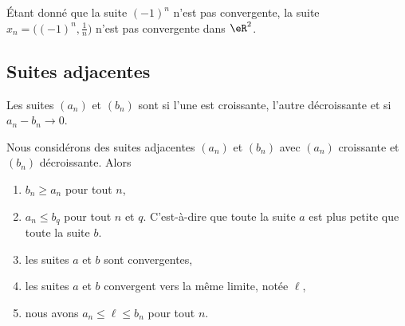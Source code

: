 \begin{example}
	Étant donné que la suite $(-1)^n$ n'est pas convergente, la suite $x_n=\big( (-1)^n,\frac{1}{ n } \big)$ n'est pas convergente dans $\eR^2$.
\end{example}

\subsection{Suites adjacentes}

\begin{definition}       \label{DEFooDMZLooDtNPmu}
    Les suites \( (a_n)\) et \( (b_n)\) sont  si l'une est croissante, l'autre décroissante et si \( a_n-b_n\to 0\).
\end{definition}

\begin{theorem}      \label{THOooZJWLooAtGMxD}
    Nous considérons des suites adjacentes \( (a_n)\) et \( (b_n)\) avec \( (a_n)\) croissante et \( (b_n)\) décroissante. Alors
    \begin{enumerate}
        \item
            \( b_n\geq a_n\) pour tout \( n\),
        \item
            \( a_n\leq b_q\) pour tout \( n\) et \( q\). C'est-à-dire que toute la suite \( a\) est plus petite que toute la suite \( b\).
        \item
            les suites \( a\) et \( b\) sont convergentes,
        \item
            les suites \( a\) et \( b\) convergent vers la même limite, notée \( \ell\),
        \item
            nous avons \( a_n\leq \ell\leq b_n\) pour tout \( n\).
    \end{enumerate}
\end{theorem}

